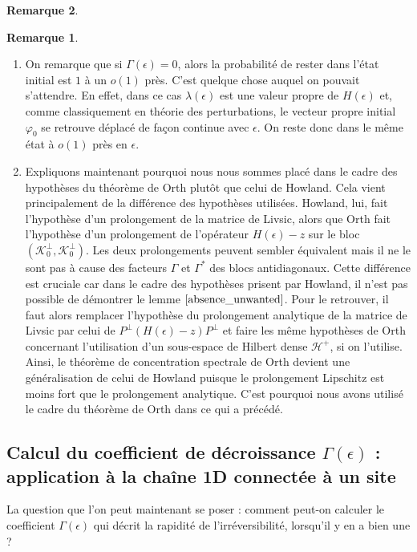 \documentclass[12pt,openany,a4paper, titlepage]{article}
\newcommand{\HH}{\mathcal{H}}
\newcommand{\vp}{\varphi}
\theoremstyle{definition}
\theoremstyle{definition}
\theoremstyle{definition}
\theoremstyle{definition}
\theoremstyle{definition}
\newtheorem{rem}{Remarque}
\theoremstyle{definition}
\begin{document}
\begin{rem}
\begin{rem}
\begin{enumerate}
    \item On remarque que si $\Gamma(\epsilon) = 0$, alors la probabilité de rester dans l'état initial est $1$ à un $o(1)$ près. C'est quelque chose auquel on pouvait s'attendre. En effet, dans ce cas $\lambda(\epsilon)$ est une valeur propre de $H(\epsilon)$ et, comme classiquement en théorie des perturbations, le vecteur propre initial $\vp_0$ se retrouve déplacé de façon continue avec $\epsilon$. On reste donc dans le même état à $o(1)$ près en $\epsilon$.
    \item Expliquons maintenant pourquoi nous nous sommes placé dans le cadre des hypothèses du théorème de Orth plutôt que celui de Howland. Cela vient principalement de la différence des hypothèses utilisées. Howland, lui, fait l'hypothèse d'un prolongement de la matrice de Livsic, alors que Orth fait l'hypothèse d'un prolongement de l'opérateur $H(\epsilon) - z $ sur le bloc $(\mathcal{K}_0^\perp,\mathcal{K}_0^\perp)$. Les deux prolongements peuvent sembler équivalent mais il ne le sont pas à cause des facteurs $\Gamma$ et $\Gamma^*$ des blocs antidiagonaux. Cette différence est cruciale car dans le cadre des hypothèses prisent par Howland, il n'est pas possible de démontrer le lemme $\ref{absence_unwanted}$. Pour le retrouver, il faut alors remplacer l'hypothèse du prolongement analytique de la matrice de Livsic par celui de $P^\perp(H(\epsilon) - z)P^\perp$ et faire les même hypothèses de Orth concernant l'utilisation d'un sous-espace de Hilbert dense $\HH^+$, si on l'utilise. Ainsi, le théorème de concentration spectrale de Orth devient une généralisation de celui de Howland puisque le prolongement Lipschitz est moins fort que le prolongement analytique. C'est pourquoi nous avons utilisé le cadre du théorème de Orth dans ce qui a précédé.
\end{enumerate}
\end{rem}

\subsection{Calcul du coefficient de décroissance $\Gamma(\epsilon)$ : application à la chaîne 1D connectée à un site}

La question que l'on peut maintenant se poser :  comment peut-on calculer le coefficient $\Gamma(\epsilon)$ qui décrit la rapidité de l'irréversibilité, lorsqu'il y en a bien une ?\\ 


\end{rem}
\end{document}
